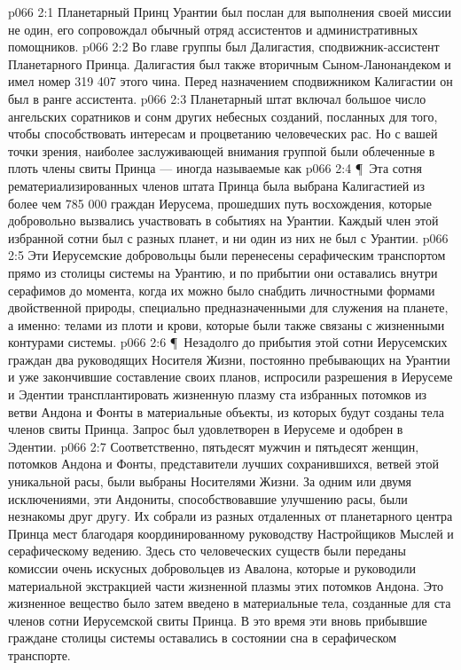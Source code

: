 \vs p066 2:1 Планетарный Принц Урантии был послан для выполнения своей миссии не один, его сопровождал обычный отряд ассистентов и административных помощников.
\vs p066 2:2 Во главе группы был Далигастия, сподвижник\hyp{}ассистент Планетарного Принца. Далигастия был также вторичным Сыном\hyp{}Ланонандеком и имел номер 319 407 этого чина. Перед назначением сподвижником Калигастии он был в ранге ассистента.
\vs p066 2:3 Планетарный штат включал большое число ангельских соратников и сонм других небесных созданий, посланных для того, чтобы способствовать интересам и процветанию человеческих рас. Но с вашей точки зрения, наиболее заслуживающей внимания группой были облеченные в плоть члены свиты Принца --- иногда называемые как 
\vs p066 2:4 \P\ Эта сотня рематериализированных членов штата Принца была выбрана Калигастией из более чем 785 000 граждан Иерусема, прошедших путь восхождения, которые добровольно вызвались участвовать в событиях на Урантии. Каждый член этой избранной сотни был с разных планет, и ни один из них не был с Урантии.
\vs p066 2:5 Эти Иерусемские добровольцы были перенесены серафическим транспортом прямо из столицы системы на Урантию, и по прибытии они оставались внутри серафимов до момента, когда их можно было снабдить личностными формами двойственной природы, специально предназначенными для служения на планете, а именно: телами из плоти и крови, которые были также связаны с жизненными контурами системы.
\vs p066 2:6 \P\ Незадолго до прибытия этой сотни Иерусемских граждан два руководящих Носителя Жизни, постоянно пребывающих на Урантии и уже закончившие составление своих планов, испросили разрешения в Иерусеме и Эдентии трансплантировать жизненную плазму ста избранных потомков из ветви Андона и Фонты в материальные объекты, из которых будут созданы тела членов свиты Принца. Запрос был удовлетворен в Иерусеме и одобрен в Эдентии.
\vs p066 2:7 Соответственно, пятьдесят мужчин и пятьдесят женщин, потомков Андона и Фонты, представители лучших сохранившихся, ветвей этой уникальной расы, были выбраны Носителями Жизни. За одним или двумя исключениями, эти Андониты, способствовавшие улучшению расы, были незнакомы друг другу. Их собрали из разных отдаленных от планетарного центра Принца мест благодаря координированному руководству Настройщиков Мыслей и серафическому ведению. Здесь сто человеческих существ были переданы комиссии очень искусных добровольцев из Авалона, которые и руководили материальной экстракцией части жизненной плазмы этих потомков Андона. Это жизненное вещество было затем введено в материальные тела, созданные для ста членов сотни Иерусемской свиты Принца. В это время эти вновь прибывшие граждане столицы системы оставались в состоянии сна в серафическом транспорте.
